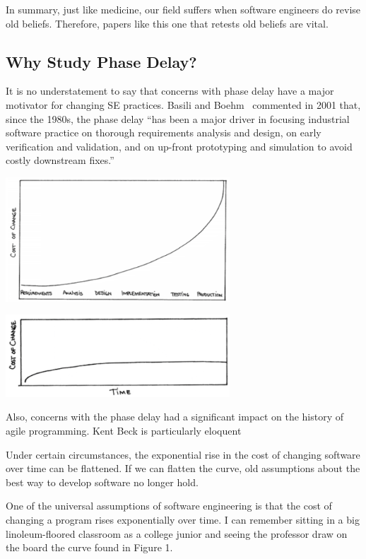 \documentclass{sig-alternate}
\begin{document}
In summary, just like medicine, our field suffers when
 software engineers do  revise old beliefs.  Therefore, papers like this one
 that retests old beliefs are vital.
\subsection{Why Study Phase Delay?}

It is no understatement to say that 
concerns with  phase delay have 
a major  motivator for changing
SE practices. Basili and Boehm~\cite{boehm01}  commented in
2001 that, since the 1980s, the phase delay
``has been a major driver in focusing
industrial software practice on thorough
requirements analysis and design,
on early verification and validation, and
on up-front prototyping and simulation
to avoid costly downstream fixes.''

\begin{center}
\includegraphics[width=3.3in]{beckB4.png}

\includegraphics[width=3.3in]{beckAFTER.png}
\end{center}

Also, concerns with the phase delay  had
 a significant impact on the history of agile programming. Kent Beck is
 particularly eloquent  

Under certain circumstances, the exponential rise in the cost of changing software over time can be flattened. If we can flatten the curve, old assumptions about the best way to develop software no longer hold.

One of the universal assumptions of software engineering is that the cost of changing a program rises exponentially over time. I can remember sitting in a big linoleum-floored classroom as a college junior and seeing the professor draw on the board the curve found in Figure 1.
\end{document}
